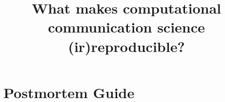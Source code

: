 \documentclass{ccr}
\title{What makes computational communication science (ir)reproducible?}
\begin{document}
\maketitle






\printbibliography

\appendix
\section{Postmortem Guide}
\label{sec:postmortem}


\end{document}
